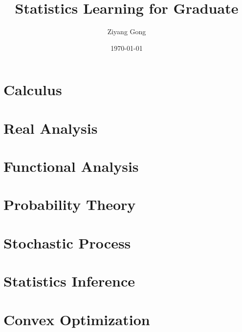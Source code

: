 \documentclass[pad,12pt,mtpro2]{elegantbook}
\title{Statistics Learning for Graduate}
\author{Ziyang Gong}
\date{\today}
\begin{document}
\maketitle
\tableofcontents
\mainmatter
\hypersetup{pageanchor=true}

\part{Calculus}




\part{Real Analysis}



\part{Functional Analysis}

\part{Probability Theory}






\part{Stochastic Process}


\part{Statistics Inference}






\part{Convex Optimization}


\end{document}
